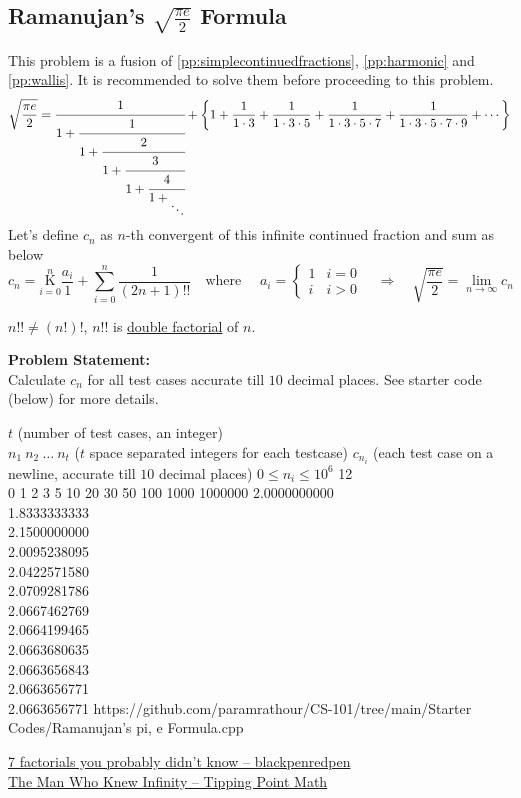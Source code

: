 \documentclass[../../Problems]{subfiles}
\begin{document}
\subsection{Ramanujan's $\sqrt{\frac{\pi e}{2}}$ Formula}{\label{pp:ramanujanpieformula}}
This problem is a fusion of \ref{pp:simplecontinuedfractions}, \ref{pp:harmonic} and \ref{pp:wallis}. It is recommended to solve them before proceeding to this problem.
\begin{equation}
 \sqrt{\frac{\pi e}{2}}=\cfrac{1}{1+{\cfrac {1}{1+{\cfrac {2}{1+{\cfrac {3}{1+{{\cfrac{4}{1+{_{\ddots }}} }}}}}}}}} + \left\{1 + \frac{1}{1\cdot3}+\frac{1}{1\cdot3\cdot5}+\frac{1}{1\cdot3\cdot5\cdot7}+\frac{1}{1\cdot3\cdot5\cdot7\cdot9}+\cdots\right\}
\end{equation}
Let's define $c_n$ as $n$-th convergent of this infinite continued fraction and sum as below
\begin{equation*}
c_n={\underset {i=0}{\overset {n }{\mathrm {K} }}}{\frac {a_i}{1}} + \sum_{i = 0}^n \frac{1}{(2n+1)!!} \quad\text{where }\quad a_i = \begin{cases} 
      1 & i = 0 \\
      i & i > 0
   \end{cases}\quad\Rightarrow\quad  \sqrt{\frac{\pi e}{2}} = \lim_{n\rightarrow\infty}c_n
\end{equation*}
\begin{note}
$n!! \neq (n!)!$, $n!!$ is \href{https://en.wikipedia.org/wiki/Double_factorial}{double factorial} of $n$.
\end{note}
\textbf{Problem Statement:}\\
Calculate $c_n$ for all test cases accurate till $10$ decimal places. See starter code (below) for more details.
\begin{testcases}
	{$t$ \hfill(number of test cases, an integer)\\$n_1\ n_2\ \ldots\ n_t$ \hfill($t$ space separated integers for each testcase)}
	{$c_{n_i}$ \hfill(each test case on a newline, accurate till $10$ decimal places)}
	{$0 \leq n_i \leq 10^{6}$}
	{12\\0 1 2 3 5 10 20 30 50 100 1000 1000000}
	{2.0000000000\\1.8333333333\\2.1500000000\\2.0095238095\\2.0422571580\\2.0709281786\\2.0667462769\\2.0664199465\\2.0663680635\\2.0663656843\\2.0663656771\\2.0663656771}
	{https://github.com/paramrathour/CS-101/tree/main/Starter Codes/Ramanujan's pi, e Formula.cpp}
\end{testcases}
\begin{funvideo}
\href{https://youtu.be/7eboFOkRHr4}{7 factorials you probably didn't know -- blackpenredpen}
\\\href{https://youtu.be/P0idBBhGNgU}{The Man Who Knew Infinity -- Tipping Point Math}
\end{funvideo}
\end{document}
